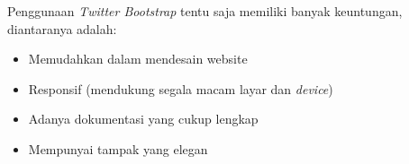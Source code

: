 	Penggunaan \textit{Twitter Bootstrap} tentu saja memiliki banyak keuntungan, diantaranya adalah:
	
	\begin{itemize}
		\item Memudahkan dalam mendesain website
		\item Responsif (mendukung segala macam layar dan \textit{device})
		\item Adanya dokumentasi yang cukup lengkap
		\item Mempunyai tampak yang elegan
	\end{itemize} 
	
	